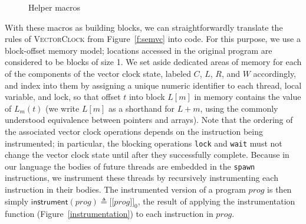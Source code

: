 \documentclass[preprint, 10pt]{sigplanconf}
\newcommand{\VCalg}{\textsc{VectorClock}\xspace}
\newcommand{\meanl}{\ensuremath{[ \! [}}
\newcommand{\meanr}{\ensuremath{] \! ]}}
\newcommand{\means}[1]{\ensuremath{\meanl #1 \meanr}}
\newcommand{\instr}[2]{\ensuremath{\means{#2}_{#1}}}
\newcommand{\instrp}[1]{\ensuremath{\mathsf{instrument}(#1)}}
\begin{document}
\begin{figure}[tb]
\caption{Helper macros}
\label{helper}
\end{figure}

With these macros as building blocks, we can straightforwardly translate the rules of \VCalg from Figure~\ref{f:semvc} into code. For this purpose, we use a block-offset memory model; locations accessed in the original program are considered to be blocks of size 1. We set aside dedicated areas of memory for each of the components of the vector clock state, labeled $C$, $L$, $R$, and $W$ accordingly, and index into them by assigning a unique numeric identifier to each thread, local variable, and lock, so that offset $t$ into block $L[m]$ in memory contains the value of $L_m(t)$ (we write $L[m]$ as a shorthand for $L + m$, using the commonly understood equivalence between pointers and arrays). Note that the ordering of the associated vector clock operations depends on the instruction being instrumented; in particular, the blocking operations \texttt{lock} and \texttt{wait} must not change the vector clock state until after they successfully complete.  Because in our language the bodies of future threads are embedded in the \texttt{spawn} instructions, we instrument these threads by recursively instrumenting each instruction in their bodies. The instrumented version of a program $\mathit{prog}$ is then simply $\instrp{\mathit{prog}} \triangleq \instr{0}{\mathit{prog}}$, the result of applying the instrumentation function (Figure~\ref{instrumentation}) to each instruction in $\mathit{prog}$.
\end{document}
